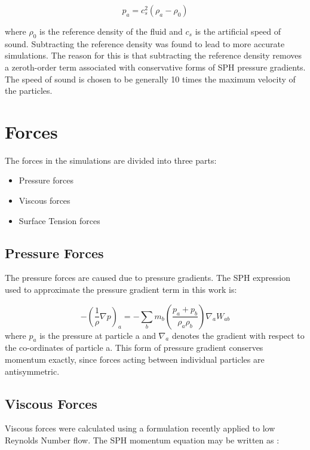 \begin{equation}
 p_a = c_s^2 (\rho_a - \rho_0)
\end{equation}

\noindent
where $\rho_0$ is the reference density of the fluid and $c_s$ is the artificial speed of sound. Subtracting the reference density was found to lead to more accurate simulations. The reason for this is that subtracting the reference density removes a zeroth-order term associated with conservative forms of SPH pressure gradients. The speed of sound is chosen to be generally 10 times the maximum velocity of the particles. 

\section{Forces}

The forces in the simulations are divided into three parts:

\begin{itemize}
 \item Pressure forces
 \item Viscous forces
 \item Surface Tension forces
\end{itemize}

\subsection{Pressure Forces}

The pressure forces are caused due to pressure gradients. The SPH expression used to approximate the pressure gradient term in this work is:

\begin{equation}
 -\left( \frac{1}{\rho} \nabla p\right)_a = -\sum_b m_b \left( \frac{p_a + p_b}{\rho_a \rho_b}\right) \nabla_a W_{ab}
\end{equation}
\noindent
where $p_a$ is the pressure at particle a and $\nabla_a$ denotes the gradient with respect to the co-ordinates of particle a. This form of pressure gradient conserves momentum exactly, since forces acting between individual particles are antisymmetric.

\subsection{Viscous Forces}

Viscous forces were calculated using a formulation recently applied to low Reynolds Number flow. \cite{viscous} The SPH momentum equation may be written as \cite{viscous}:

